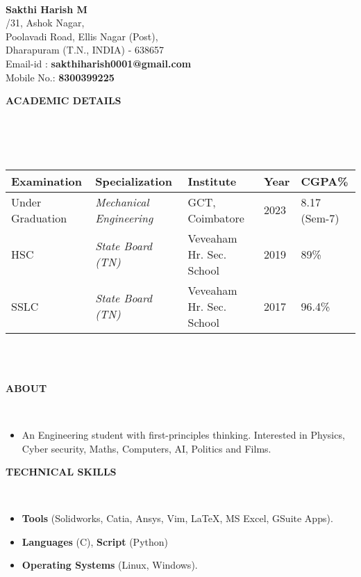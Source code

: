 \documentclass[a4paper,10pt]{article}
\newcommand{\lsep}{-0.5cm}
\newcommand{\resheading}[1]{{\small \colorbox{mygrey}{\begin{minipage}{0.975\textwidth}{\textbf{#1 \vphantom{p\^{E}}}}\end{minipage}}}}
\begin{document}
\hspace{0.5cm}\\[-0.2cm]

\textbf{Sakthi Harish M} \\
/31, Ashok Nagar, \\
\indent Poolavadi Road, Ellis Nagar (Post), \\
\indent Dharapuram (T.N., INDIA) - 638657\\
\indent Email-id : \textbf{sakthiharish0001@gmail.com} \\
\indent Mobile No.: \textbf{8300399225} \\

\resheading{\textbf{ACADEMIC DETAILS} }\\[\lsep]
\\ \\
\indent \begin{tabular}{ l @{\hskip 0.15in} l @{\hskip 0.15in} l @{\hskip 0.15in} l @{\hskip 0.15in} l }
\hline
\textbf{Examination} & \textbf{Specialization} & \textbf{Institute} & \textbf{Year} & \textbf{CGPA\%} \\
\hline
Under Graduation & \textit{Mechanical Engineering} & GCT, Coimbatore & 2023 & 8.17 (Sem-7)\\
HSC & \textit{State Board (TN)} & Veveaham Hr. Sec. School & 2019 & 89\% \\
SSLC & \textit{State Board (TN)} & Veveaham Hr. Sec. School & 2017 & 96.4\% \\
\hline
\end{tabular}
\\ \\

\resheading{\textbf{ABOUT} }\\[\lsep]
\begin{itemize}
\item \noindent An Engineering student with first-principles thinking. Interested in Physics, Cyber security, Maths, Computers, AI, Politics and Films. 
\end{itemize}

\resheading{\textbf{TECHNICAL SKILLS} }\\[\lsep]
\begin{itemize}
\item \noindent \textbf{Tools} (Solidworks, Catia, Ansys, Vim, \LaTeX, MS Excel, GSuite Apps).
\item \noindent \textbf{Languages} (C), \textbf{Script} (Python)
\item \noindent \textbf{Operating Systems} (Linux, Windows).
\end{itemize}
\end{document}

